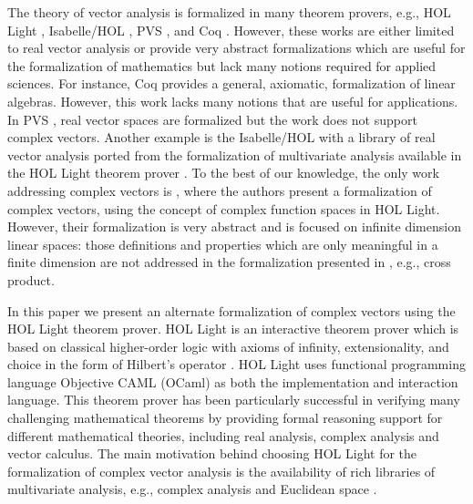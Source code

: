 \documentclass{llncs}
\begin{document}
 The theory of vector analysis is formalized in many theorem provers, e.g., HOL Light \cite{harrison_13hol}, Isabelle/HOL \cite{isabelleVEC}, PVS \cite{PVS}, and Coq \cite{CoqLinearAlgebra}. 
However, these works are either limited to real vector analysis or
    provide very abstract formalizations which are useful for the formalization
    of mathematics but lack many notions required for applied sciences. 
    For instance,  Coq \cite{CoqLinearAlgebra} provides a general, axiomatic,
  formalization of linear algebras. However, this work lacks many notions
  that are useful for applications.
In PVS \cite{PVS}, real vector spaces are formalized but the work does not support complex vectors. 
Another example is the Isabelle/HOL \cite{isabelleVEC} with a library of real vector analysis ported from the formalization of multivariate analysis available in the HOL Light theorem prover \cite{harrison_13hol}. To the best of our knowledge, the only work addressing complex vectors is 
\cite{NFMYousri}, where the authors present a formalization of complex vectors, using the concept of complex function spaces in HOL Light. However, their formalization is very abstract and is focused on infinite dimension linear spaces: those definitions and properties which are only meaningful in a finite dimension are not addressed in the formalization presented in \cite{NFMYousri}, e.g., cross product. 



In this paper we present an alternate formalization of complex vectors using the HOL Light theorem prover. 
HOL Light is an interactive theorem prover which is based on classical higher-order logic with axioms of infinity, extensionality, and choice in the form of Hilbert's \hol{\epsilon} operator \cite{harrison_09hol}. HOL Light uses functional programming language Objective CAML (OCaml) as both the implementation and interaction language. 
This theorem prover has been particularly successful in verifying many challenging mathematical theorems by providing formal reasoning support for different mathematical theories, including real analysis, complex analysis and vector calculus. 
The main motivation behind choosing HOL Light for the formalization of complex vector analysis is the availability of rich libraries of multivariate analysis, e.g., complex analysis \cite{harrison_07} and Euclidean space \cite{harrison_13hol}. 
\end{document}
